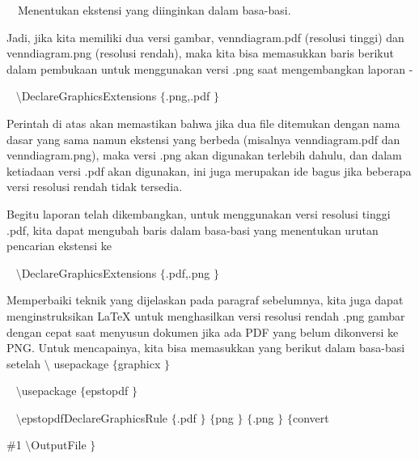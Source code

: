 \noindent
 $  $ $  $ $  $ $  $Menentukan ekstensi yang diinginkan dalam basa-basi. \par
\vspace{12pt}
\noindent
Jadi, jika kita memiliki dua versi gambar, venndiagram.pdf (resolusi tinggi) dan venndiagram.png (resolusi rendah), maka kita bisa memasukkan baris berikut dalam pembukaan untuk menggunakan versi .png saat mengembangkan laporan - \par
\vspace{28pt}
\noindent
~  $  \setminus $DeclareGraphicsExtensions $  \{  $.png,.pdf $  \}  $ \par
\noindent
Perintah di atas akan memastikan bahwa jika dua file ditemukan dengan nama dasar yang sama namun ekstensi yang berbeda (misalnya venndiagram.pdf dan venndiagram.png), maka versi .png akan digunakan terlebih dahulu, dan dalam ketiadaan versi .pdf akan digunakan, ini juga merupakan ide bagus jika beberapa versi resolusi rendah tidak tersedia. \par
\vspace{12pt}
\noindent
Begitu laporan telah dikembangkan, untuk menggunakan versi resolusi tinggi .pdf, kita dapat mengubah baris dalam basa-basi yang menentukan urutan pencarian ekstensi ke \par
\vspace{12pt}
\vspace{16pt}
\noindent
~  $  \setminus $DeclareGraphicsExtensions $  \{  $.pdf,.png $  \}  $ \par
\vspace{12pt}
\vspace{12pt}
\vspace{16pt}
\noindent
Memperbaiki teknik yang dijelaskan pada paragraf sebelumnya, kita juga dapat menginstruksikan LaTeX untuk menghasilkan versi resolusi rendah .png gambar dengan cepat saat menyusun dokumen jika ada PDF yang belum dikonversi ke PNG. Untuk mencapainya, kita bisa memasukkan yang berikut dalam basa-basi setelah  $  \setminus $ usepackage  $  \{  $graphicx $  \}  $ \par
\vspace{16pt}
\noindent
~  $  \setminus $usepackage $  \{  $epstopdf $  \}  $ \par
\vspace{12pt}
\noindent
~  $  \setminus $epstopdfDeclareGraphicsRule $  \{  $.pdf $  \}  $ $  \{  $png $  \}  $ $  \{  $.png $  \}  $ $  \{  $convert \par
\vspace{12pt}
\noindent
  $  \#  $1  $  \setminus $OutputFile $  \}  $ \par
